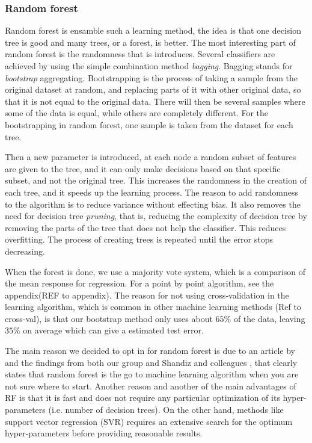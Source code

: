 \subsubsection{Random forest}
Random forest is ensamble such a learning method, the idea is that one decision tree is good and many trees, or a forest, is better. The most interesting part of random forest is the randomness that is introduces. Several classifiers are achieved by using the simple combination method \textit{bagging}. Bagging stands for \textit{bootstrap} aggregating. Bootstrapping is the process of taking a sample from the original dataset at random, and replacing parts of it with other original data, so that it is not equal to the original data. There will then be several samples where some of the data is equal, while others are completely different. For the bootstrapping in random forest, one sample is taken from the dataset for each tree. 

Then a new parameter is introduced, at each node a random subset of features are given to the tree, and it can only make decisions based on that specific subset, and not the original tree. This increases the randomness in the creation of each tree, and it speeds up the learning process. The reason to add randomness to the algorithm is to reduce variance without effecting bias. It also removes the need for decision tree \textit{pruning}, that is, reducing the complexity of decision tree by removing the parts of the tree that does not help the classifier. This reduces overfitting. The process of creating trees is repeated until the error stops decreasing. 

When the forest is done, we use a majority vote system, which is a comparison of the mean response for regression. For a point by point algorithm, see the appendix(REF to appendix). 
The reason for not using cross-validation in the learning algorithm, which is common in other machine learning methods (Ref to cross-val), is that our bootstrap method only uses about $65\%$ of the data, leaving $35\%$ on average which can give a estimated test error. 

The main reason we decided to opt in for random forest is due to an article by \cite{fernandez2014we} and the findings from both our group \cite{fanourgakis2020automatedML} and Shandiz and colleagues \cite{shandiz2016application}, that clearly states that random forest is the go to machine learning algorithm when you are not sure where to start. Another reason and another of the main advantages of RF is that it is fast and does not require any particular optimization of its hyper-parameters (i.e. number of decision trees). On the other hand, methods like support vector regression (SVR) requires an extensive search for the optimum hyper-parameters before providing reasonable results.

